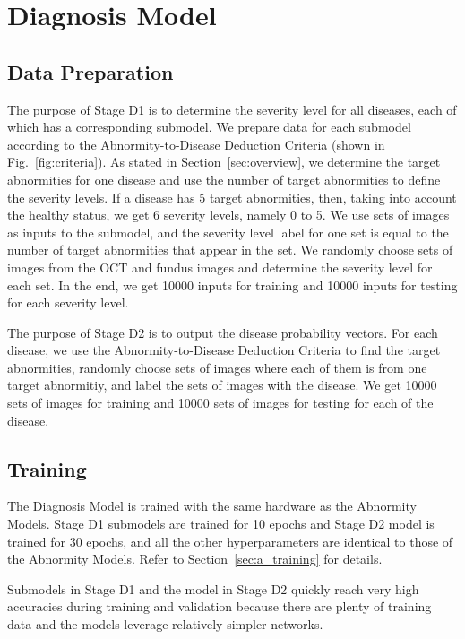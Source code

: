 \documentclass{article}
\begin{document}
	\section{Diagnosis Model}
	
	\subsection{Data Preparation}
	
	The purpose of Stage D1 is to determine the severity level for all diseases, each of which has a corresponding submodel. We prepare data for each submodel according to the Abnormity-to-Disease Deduction Criteria (shown in Fig.~\ref{fig:criteria}). As stated in Section~\ref{sec:overview}, we determine the target abnormities for one disease and use the number of target abnormities to define the severity levels. If a disease has 5 target abnormities, then, taking into account the healthy status, we get 6 severity levels, namely 0 to 5. We use sets of images as inputs to the submodel, and the severity level label for one set is equal to the number of target abnormities that appear in the set. We randomly choose sets of images from the OCT and fundus images and determine the severity level for each set. In the end, we get 10000 inputs for training and 10000 inputs for testing for each severity level. 
	
	The purpose of Stage D2 is to output the disease probability vectors. For each disease, we use the Abnormity-to-Disease Deduction Criteria to find the target abnormities, randomly choose sets of images where each of them is from one target abnormitiy, and label the sets of images with the disease. We get 10000 sets of images for training and 10000 sets of images for testing for each of the disease.
	
	\subsection{Training}
	
	The Diagnosis Model is trained with the same hardware as the Abnormity Models. Stage D1 submodels are trained for 10 epochs and Stage D2 model is trained for 30 epochs, and all the other hyperparameters are identical to those of the Abnormity Models. Refer to Section~\ref{sec:a_training} for details. 
	
	Submodels in Stage D1 and the model in Stage D2 quickly reach very high accuracies during training and validation because there are plenty of training data and the models leverage relatively simpler networks. 
	
\end{document}

